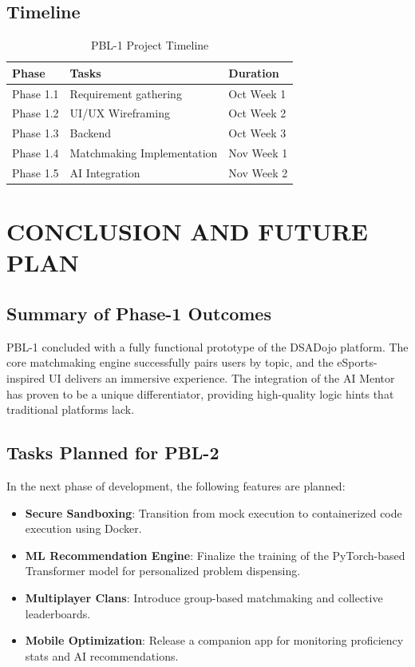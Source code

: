 \documentclass[12pt,a4paper]{report}
\begin{document}
\section{Timeline}
\begin{table}[H]
    \centering
    \caption{PBL-1 Project Timeline}
    \begin{tabular}{|l|l|l|}
    \hline
    \textbf{Phase} & \textbf{Tasks} & \textbf{Duration} \\ \hline
    Phase 1.1 & Requirement gathering & Oct Week 1 \\ \hline
    Phase 1.2 & UI/UX Wireframing & Oct Week 2 \\ \hline
    Phase 1.3 & Backend & Oct Week 3 \\ \hline
    Phase 1.4 & Matchmaking Implementation & Nov Week 1 \\ \hline
    Phase 1.5 & AI Integration & Nov Week 2 \\ \hline
    \end{tabular}
\end{table}

\chapter{CONCLUSION AND FUTURE PLAN}
\section{Summary of Phase-1 Outcomes}
PBL-1 concluded with a fully functional prototype of the DSADojo platform. The core matchmaking engine successfully pairs users by topic, and the eSports-inspired UI delivers an immersive experience. The integration of the AI Mentor has proven to be a unique differentiator, providing high-quality logic hints that traditional platforms lack.

\section{Tasks Planned for PBL-2}
In the next phase of development, the following features are planned:
\begin{itemize}
    \item \textbf{Secure Sandboxing}: Transition from mock execution to containerized code execution using Docker.
    \item \textbf{ML Recommendation Engine}: Finalize the training of the PyTorch-based Transformer model for personalized problem dispensing.
    \item \textbf{Multiplayer Clans}: Introduce group-based matchmaking and collective leaderboards.
    \item \textbf{Mobile Optimization}: Release a companion app for monitoring proficiency stats and AI recommendations.
\end{itemize}
\end{document}
